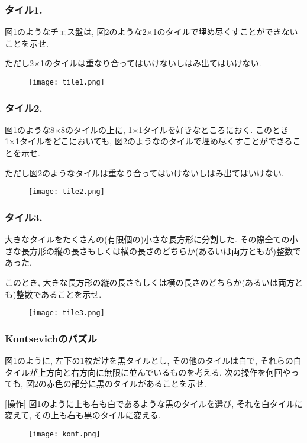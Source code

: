 \documentclass[11pt,dvipdfmx]{beamer}
\theoremstyle{definition}
\theoremstyle{remark}
\begin{document}
\begin{frame}
\frametitle{タイル1. }
図1のようなチェス盤は, 図2のような2×1のタイルで埋め尽くすことができないことを示せ.

ただし2×1のタイルは重なり合ってはいけないしはみ出てはいけない.
\begin{figure}[htbp]
\begin{center}
\texttt{[image: tile1.png]}
\end{center}
\end{figure}
\end{frame}



\begin{frame}
\frametitle{タイル2. }
図1のような8×8のタイルの上に, 1×1タイルを好きなところにおく. 
このとき1×1タイルをどこにおいても, 図2のようなのタイルで埋め尽くすことができることを示せ.

ただし図2のようなタイルは重なり合ってはいけないしはみ出てはいけない.
\begin{figure}[htbp]
\begin{center}
\texttt{[image: tile2.png]}
\end{center}
\end{figure}
\end{frame}


\begin{frame}
\frametitle{タイル3. }
大きなタイルをたくさんの(有限個の)小さな長方形に分割した. 
その際全ての小さな長方形の縦の長さもしくは横の長さのどちらか(あるいは両方ともが)整数であった.

\vspace{5pt}
このとき, 大きな長方形の縦の長さもしくは横の長さのどちらか(あるいは両方とも)整数であることを示せ.
\begin{figure}[htbp]
\begin{center}
\texttt{[image: tile3.png]}
\end{center}
\end{figure}
\end{frame}


\begin{frame}
\frametitle{Kontsevichのパズル}
図1のように, 左下の1枚だけを黒タイルとし, その他のタイルは白で, それらの白タイルが上方向と右方向に無限に並んでいるものを考える.
次の操作を何回やっても, 図2の赤色の部分に黒のタイルがあることを示せ. 

\vspace{5pt}
[操作] 図1のように上も右も白であるような黒のタイルを選び, それを白タイルに変えて, その上も右も黒のタイルに変える.

\begin{figure}[htbp]
\begin{center}
\texttt{[image: kont.png]}
\end{center}
\end{figure}
\end{frame}
\end{document}
